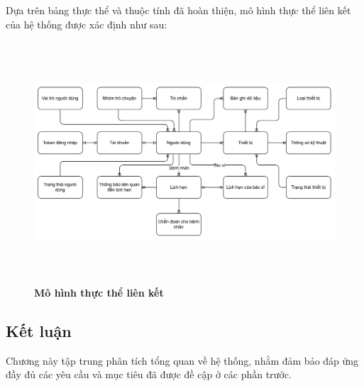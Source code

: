 Dựa trên bảng thực thể và thuộc tính đã hoàn thiện, mô hình thực thể liên kết của hệ thống được xác định như sau:

\begin{figure}[H]
	\centering
	\includegraphics[width=15.5cm,height=9cm]{Images/System/fmECG_connection_entity.png}
	\caption[Mô hình thực thể liên kết]{\bfseries \fontsize{12pt}{0pt}
		\selectfont Mô hình thực thể liên kết}
	\label{entity-diag}
\end{figure}

\subsection{Kết luận}

Chương này tập trung phân tích tổng quan về hệ thống, nhằm đảm bảo đáp ứng đầy đủ các yêu cầu và mục tiêu đã được đề cập ở các phần trước.

\newpage
